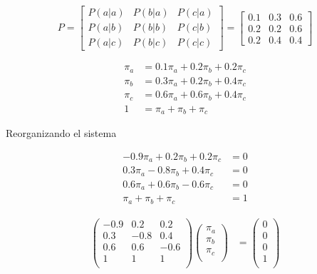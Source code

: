 \documentclass{article}
\begin{document}
\[
    P = \begin{bmatrix}
        P(a|a) & P(b|a) & P(c|a) \\
        P(a|b) & P(b|b) & P(c|b) \\
        P(a|c) & P(b|c) & P(c|c)
    \end{bmatrix}
    = \begin{bmatrix}
        0.1 & 0.3 & 0.6 \\
        0.2 & 0.2 & 0.6 \\
        0.2 & 0.4 & 0.4
    \end{bmatrix}
\]

\begin{align*}
    \pi_a & = 0.1\pi_a + 0.2\pi_b + 0.2\pi_c \\
    \pi_b & = 0.3\pi_a + 0.2\pi_b + 0.4\pi_c \\
    \pi_c & = 0.6\pi_a + 0.6\pi_b + 0.4\pi_c \\
    1     & = \pi_a + \pi_b + \pi_c
\end{align*}

Reorganizando el sistema

\begin{align*}
    -0.9\pi_a + 0.2\pi_b + 0.2\pi_c & = 0 \\
    0.3\pi_a - 0.8\pi_b + 0.4\pi_c  & = 0 \\
    0.6\pi_a + 0.6\pi_b - 0.6\pi_c  & = 0 \\
    \pi_a + \pi_b + \pi_c           & = 1
\end{align*}

\begin{align*}
    \begin{pmatrix}
        -0.9 & 0.2  & 0.2  \\
        0.3  & -0.8 & 0.4  \\
        0.6  & 0.6  & -0.6 \\
        1    & 1    & 1    \\
    \end{pmatrix}
    \begin{pmatrix}
        \pi_a \\
        \pi_b \\
        \pi_c \\
    \end{pmatrix}
     & =
    \begin{pmatrix}
        0 \\
        0 \\
        0 \\
        1 \\
    \end{pmatrix}
\end{align*}
\end{document}
